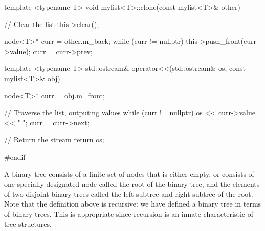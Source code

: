 \documentclass{report}
\begin{document}
    \pagebreak 
    \begin{cppcode}
template <typename T>
void mylist<T>::clone(const mylist<T>& other) {

    // Clear the list
    this->clear();
    
    node<T>* curr = other.m_back;
    while (curr != nullptr) {
        this->push_front(curr->value);
        curr = curr->prev;
    }
}

template <typename T>
std::ostream& operator<<(std::ostream& os, const mylist<T>& obj) {

    node<T>* curr = obj.m_front;

    // Traverse the list, outputing values
    while (curr != nullptr) {
        os << curr->value << " ";
        curr = curr->next;
    }

    // Return the stream
    return os;
}
#endif
    \end{cppcode}

    \pagebreak 
    \bigbreak \noindent 
    \begin{concept}
        A binary tree consists of a finite set of nodes that is either empty, or consists of one specially designated node called the root of the binary tree, and the elements of two disjoint binary trees called the left subtree and right subtree of the root.
        \bigbreak \noindent 
        Note that the definition above is recursive: we have defined a binary tree in terms of binary trees. This is appropriate since recursion is an innate characteristic of tree structures.
    \end{concept}
    \bigbreak \noindent 
    \bigbreak \noindent 
\end{document}
